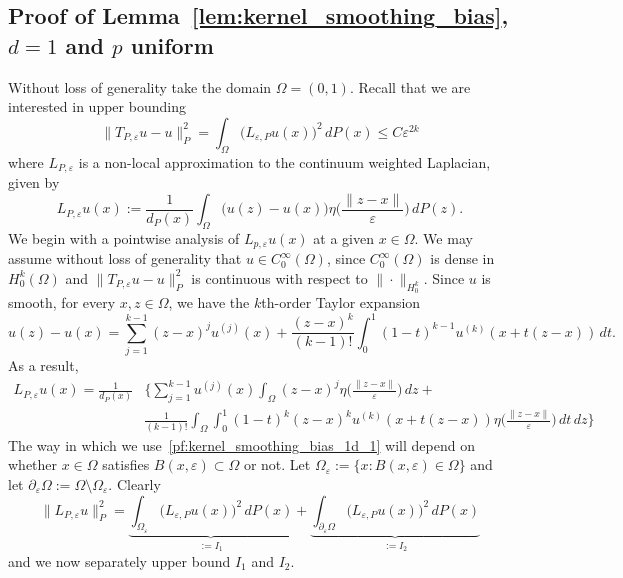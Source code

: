 \documentclass{article}
\newcommand{\1}{\mathbf{1}}
\theoremstyle{definition}
\theoremstyle{remark}
\begin{document}
\subsection{Proof of Lemma~\ref{lem:kernel_smoothing_bias}, $d = 1$ and $p$ uniform}
Without loss of generality take the domain $\Omega = (0,1)$. Recall that we are interested in upper bounding
\begin{equation*}
\|T_{P,\varepsilon}u - u\|_{P}^2 = \int_{\Omega} \bigl(L_{\varepsilon,P}u(x)\bigr)^2 \,dP(x) \leq C\varepsilon^{2k}
\end{equation*}
where $L_{P,\varepsilon}$ is a non-local approximation to the continuum weighted Laplacian, given by
\begin{equation*}
L_{P,\varepsilon}u(x) := \frac{1}{d_P(x)}\int_{\Omega} \bigl(u(z) - u(x)\bigr) \eta\biggl(\frac{\|z - x\|}{\varepsilon}\biggr) \,dP(z).
\end{equation*}
We begin with a pointwise analysis of $L_{p,\varepsilon}u(x)$ at a given $x \in \Omega$. We may assume without loss of generality that $u \in C_0^{\infty}(\Omega)$, since $C_0^{\infty}(\Omega)$ is dense in $H_0^k(\Omega)$ and $\|T_{P,\varepsilon}u - u\|_P^2$ is continuous with respect to $\|\cdot\|_{H_0^k}$. Since $u$ is smooth, for every $x,z \in \Omega$, we have the $k$th-order Taylor expansion
\begin{equation*}
u(z) - u(x) = \sum_{j = 1}^{k - 1} (z - x)^{j} u^{(j)}(x)  + \frac{(z - x)^k}{(k - 1)!}\int_{0}^{1}(1 - t)^{k - 1}u^{(k)}(x + t(z - x))\,dt.
\end{equation*}
As a result,
\begin{equation}
\label{pf:kernel_smoothing_bias_1d_1}
\begin{aligned}
L_{P,\varepsilon}u(x) = \frac{1}{d_P(x)} & \Biggl\{\sum_{j = 1}^{k - 1} u^{(j)}(x) \int_{\Omega}(z - x)^{j}\eta\biggl(\frac{\|z - x\|}{\varepsilon}\biggr)\,dz + \\ 
& \frac{1}{(k - 1)!} \int_{\Omega} \int_{0}^{1} (1 - t)^k (z - x)^k u^{(k)}(x + t(z - x)) \eta\biggl(\frac{\|z - x\|}{\varepsilon}\biggr) \,dt \,dz \Biggr\}
\end{aligned}
\end{equation}
The way in which we use~\eqref{pf:kernel_smoothing_bias_1d_1} will depend on whether $x \in \Omega$ satisfies $B(x,\varepsilon) \subset \Omega$ or not. Let $\Omega_{\varepsilon} := \{x: B(x,\varepsilon) \in \Omega\}$ and let $\partial_{\varepsilon}\Omega := \Omega \setminus \Omega_{\varepsilon}$. Clearly
\begin{equation*}
\|L_{P,\varepsilon}u\|_{P}^2 = \underbrace{\int_{\Omega_{\varepsilon}} \bigl(L_{\varepsilon,P}u(x)\bigr)^2 \,dP(x)}_{:=I_1} + \underbrace{\int_{\partial_{\varepsilon}\Omega} \bigl(L_{\varepsilon,P}u(x)\bigr)^2 \,dP(x)}_{:=I_2}
\end{equation*}
and we now separately upper bound $I_1$ and $I_2$.
\end{document}
